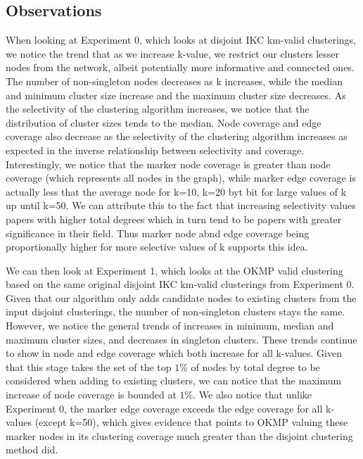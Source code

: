 \documentclass{article}
\begin{document}
\subsection{Observations}

When looking at Experiment 0, which looks at disjoint IKC km-valid clusterings, we notice the trend that as we increase k-value, we restrict our clusters lesser nodes from the network, albeit potentially more informative and connected ones. The number of non-singleton nodes decreases as k increases, while the median and minimum cluster size increase and the maximum cluster size decreases. As the selectivity of the clustering algorithm increases, we notice that the distribution of cluster sizes tends to the median. Node coverage and edge coverage also decrease as the selectivity of the clustering algorithm increases as expected in the inverse relationship between selectivity and coverage. Interestingly, we notice that the marker node coverage is greater than node coverage (which represents all nodes in the graph), while marker edge coverage is actually less that the average node for k=10, k=20 byt bit for large values of k up until k=50. We can attribute this to the fact that increasing selectivity values papers with higher total degrees which in turn tend to be papers with greater significance in their field. Thus marker node abnd edge coverage being proportionally higher for more selective values of k supports this idea. \newline\newline

We can then look at Experiment 1, which looks at the OKMP valid clustering based on the same original disjoint IKC km-valid clusterings from Experiment 0. Given that our algorithm only adds candidate nodes to existing clusters from the input disjoint clusterings, the number of non-singleton clusters stays the same. However, we notice the general trends of increases in minimum, median and maximum cluster sizes, and decreases in singleton clusters. These trends continue to show in node and edge coverage which both increase for all k-values. Given that this stage takes the set of the top $1\%$ of nodes by total degree to be considered when adding to existing clusters, we can notice that the maximum increase of node coverage is bounded at $1\%$. We also notice that unlike Experiment 0, the marker edge coverage exceeds the edge coverage for all k-values (except k=50), which gives evidence that points to OKMP valuing these marker nodes in its clustering coverage much greater than the disjoint clustering method did. \newline\newline
\end{document}
